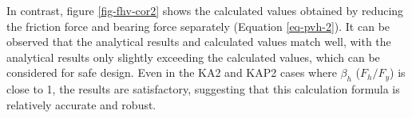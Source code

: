 In contrast, figure \ref{fig-fhv-cor2} shows the calculated values obtained by reducing the friction force and bearing force separately (Equation \ref{eq-pvh-2}). It can be observed that the analytical results and calculated values match well, with the analytical results only slightly exceeding the calculated values, which can be considered for safe design. Even in the KA2 and KAP2 cases where $\beta_h$ ($F_h/F_y$) is close to 1, the results are satisfactory, suggesting that this calculation formula is relatively accurate and robust.

